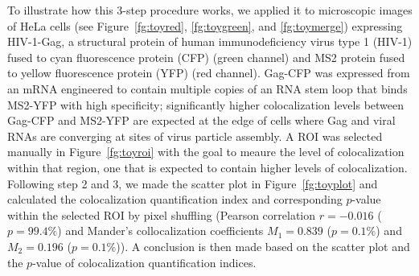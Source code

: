 \documentclass[10pt,twocolumn,twoside]{IEEEtran}
\begin{document}
To illustrate how this 3-step procedure works, we applied it to microscopic images of HeLa cells (see Figure~\ref{fg:toyred}, \ref{fg:toygreen}, and \ref{fg:toymerge}) expressing HIV-1-Gag, a structural protein of human immunodeficiency virus type 1 (HIV-1) fused to cyan fluorescence protein (CFP) (green channel) and MS2 protein fused to yellow fluorescence protein (YFP) (red channel).  Gag-CFP was expressed from an mRNA engineered to contain multiple copies of an RNA stem loop that binds MS2-YFP with high specificity; significantly higher colocalization levels between Gag-CFP and MS2-YFP are expected at the edge of cells where Gag and viral RNAs are converging at sites of virus particle assembly. A ROI was selected manually in Figure~\ref{fg:toyroi} with the goal to meaure the level of colocalization within that region, one that is expected to contain higher levels of colocalization. Following step 2 and 3, we made the scatter plot in Figure~\ref{fg:toyplot} and calculated the colocalization quantification index  and corresponding $p$-value within the selected ROI by pixel shuffling (Pearson correlation $r=-0.016$ ($p=99.4\%$) and Mander's collocalization coefficients $M_1=0.839$ ($p=0.1\%$) and $M_2=0.196$ ($p=0.1\%$)). A conclusion is then made based on the scatter plot and the $p$-value of colocalization quantification indices.
\end{document}
